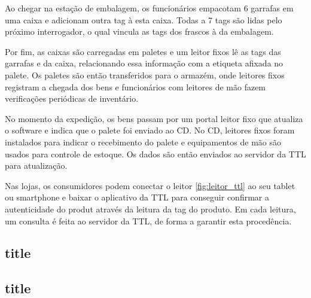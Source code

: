 Ao chegar na estação de embalagem, os funcionários empacotam 6 garrafas em uma caixa e adicionam outra tag à esta caixa. Todas a 7 tags são lidas pelo próximo interrogador, o qual vincula as tags dos frascos à da embalagem.

Por fim, as caixas são carregadas em paletes e um leitor fixos lê as tags das garrafas e da caixa, relacionando essa informação com a etiqueta afixada no palete. Os paletes são então transferidos para o armazém, onde leitores fixos registram a chegada dos bens e funcionários com leitores de mão fazem verificações periódicas de inventário.

No momento da expedição, os bens passam por um portal leitor fixo que atualiza o software e indica que o palete foi enviado ao CD. No CD, leitores fixos foram instalados para indicar o recebimento do palete e equipamentos de mão são usados para controle de estoque. Os dados são então enviados ao servidor da TTL para atualização.

Nas lojas, os consumidores podem conectar o leitor \ref{fig:leitor_ttl} ao seu tablet ou smartphone e baixar o aplicativo da TTL para conseguir confirmar a autenticidade do produt através da leitura da tag do produto. Em cada leitura, um consulta é feita ao servidor da TTL, de forma a garantir esta procedência.

\subsection{title}


\subsection{title}
